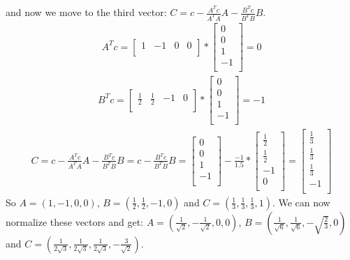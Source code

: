 \documentclass[a4paper,11pt]{article}
\begin{document}
and now we move to the third vector:
$C=c-\frac{A^Tc}{A^TA}A-\frac{B^Tc}{B^TB}B$.
\begin{align*}
A^Tc=
\begin{bmatrix}
1 & -1 & 0 & 0 \\
\end{bmatrix}
*
\begin{bmatrix}
0 \\
0 \\
1 \\
-1 \\
\end{bmatrix}
= 0
\end{align*}
\begin{align*}
B^Tc=
\begin{bmatrix}
\frac{1}{2} & \frac{1}{2} & -1 & 0 \\
\end{bmatrix}
*
\begin{bmatrix}
0 \\
0 \\
1 \\
-1 \\
\end{bmatrix}
= -1
\end{align*}
\begin{align*}
C=c-\frac{A^Tc}{A^TA}A-\frac{B^Tc}{B^TB}B=c-\frac{B^Tc}{B^TB}B=
\begin{bmatrix}
0 \\
0 \\
1 \\
-1 \\
\end{bmatrix}
-
\frac{-1}{1.5}*
\begin{bmatrix}
\frac{1}{2} \\
\frac{1}{2} \\
-1 \\
0 \\
\end{bmatrix}
=
\begin{bmatrix}
\frac{1}{3} \\
\frac{1}{3} \\
\frac{1}{3} \\
-1 \\
\end{bmatrix}
\end{align*}
So $A=(1,-1,0,0)$, $B=(\frac{1}{2}, \frac{1}{2}, -1, 0)$ and $C=(\frac{1}{3},\frac{1}{3},\frac{1}{3},1)$. 
We can now normalize these vectors and get:
$A=(\frac{1}{\sqrt{2}},-\frac{1}{\sqrt{2}},0,0)$, $B=(\frac{1}{\sqrt{6}}, \frac{1}{\sqrt{6}}, -\sqrt{\frac{2}{3}}, 0)$ and $C=(\frac{1}{2\sqrt{3}},\frac{1}{2\sqrt{3}},\frac{1}{2\sqrt{3}},-\frac{3}{\sqrt{2}})$.
\end{document}
